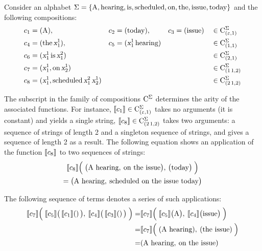 \documentclass[../../document.tex]{subfiles}
\begin{document}
    \begin{example}\label{ex:lcfrs:comp}
        Consider an alphabet \(\Sigma=\{\text{A}, \text{hearing}, \text{is}, \text{scheduled}, \text{on}, \text{the}, \text{issue}, \text{today}\}\) and the following compositions:
        \begin{align*}
            c_1 &= (\text{A}), & c_2 &= (\text{today}), & c_3 &= (\text{issue}) && \in \mathrm{C}^\Sigma_{(\varepsilon, 1)} \\
            c_4 &= (\text{the} \, \textsl{x}_1^1), & c_5 &= (\textsl{x}_1^1 \, \text{hearing}) & & && \in \mathrm{C}^\Sigma_{(1,1)} \\
            c_6 &= (\textsl{x}_1^1 \, \text{is} \, \textsl{x}_1^2) && && && \in \mathrm{C}^\Sigma_{(2,1)} \\
            c_7 &= (\textsl{x}_1^1, \text{on} \, \textsl{x}_2^1) && && && \in \mathrm{C}^\Sigma_{(1\,1,2)}   \\
            c_8 &= (\textsl{x}_1^1, \text{scheduled} \, \textsl{x}_1^2 \, \textsl{x}_2^1) && && && \in \mathrm{C}^\Sigma_{(2\,1,2)}
        \end{align*}

        The subscript in the family of compositions \(\mathrm{C}^\Sigma\) determines the arity of the associated functions.
        For instance, \(\llbracket c_1\rrbracket \in \mathrm{C}^\Sigma_{(\varepsilon, 1)}\) takes no arguments (it is constant) and yields a single string,
        \(\llbracket c_8\rrbracket \in \mathrm{C}^\Sigma_{(2\,1, 2)}\) takes two arguments: a sequence of strings of length 2 and a singleton sequence of strings, and gives a sequence of length 2 as a result.
        The following equation shows an application of the function \(\llbracket c_8\rrbracket\) to two sequences of strings: 
        \begin{multline*}
            \llbracket c_8\rrbracket\Big( \; \big( \text{A hearing}, \: \text{on the issue} \big), \, \big( \text{today} \big) \; \Big)
            \\= \big( \text{A hearing}, \: \text{scheduled on the issue today} \big)
        \end{multline*}

        The following sequence of terms denotes a series of such applications:
        \begin{align*}
            \llbracket c_7\rrbracket\Big( \; \llbracket c_5\rrbracket\big(\,\llbracket c_1\rrbracket()\,\big), \: \llbracket c_4\rrbracket\big(\,\llbracket c_3\rrbracket()\,\big) \; \Big)
            =& \llbracket c_7\rrbracket\Big( \; \llbracket c_5\rrbracket\big(\text{A}\big), \: \llbracket c_4\rrbracket\big(\text{issue}\big) \; \Big) \\
            =& \llbracket c_7\rrbracket\Big( \; (\text{A hearing}), \: (\text{the issue}) \; \Big) \\
            =& (\text{A hearing}, \: \text{on the issue})
        \end{align*}
    \end{example}
\end{document}
